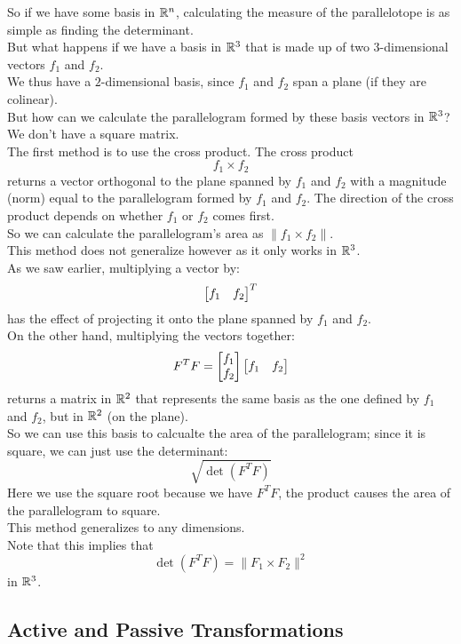 \documentclass[12pt]{article}
\begin{document}
So if we have some basis in $\mathbb{R}^n$,
calculating the measure of the
parallelotope is as simple as finding the
determinant. \\

But what happens if we have a basis in $\mathbb{R}^3$
that is made up of two $3$-dimensional vectors $f_1$
and $f_2$. \\
We thus have a $2$-dimensional basis,
since $f_1$ and $f_2$ span a plane
(if they are colinear). \\
But how can we calculate the parallelogram
formed by these basis vectors in $\mathbb{R}^3$?
We don't have a square matrix. \\

The first method is to use the cross product.
The cross product
\[ f_1 \times f_2 \]
returns a vector orthogonal to the plane
spanned by $f_1$ and $f_2$
with a magnitude (norm) equal to
the parallelogram formed by $f_1$ and $f_2$.
The direction of the cross product
depends on whether $f_1$ or $f_2$
comes first. \\
So we can calculate the parallelogram's
area as $\|f_1 \times f_2\|$. \\

This method does not generalize however
as it only works in $\mathbb{R}^3$. \\
As we saw earlier,
multiplying a vector by:
\[ \begin{bmatrix} {f_1} & {f_2} \end{bmatrix}^T \]
has the effect of projecting it
onto the plane spanned by $f_1$ and $f_2$. \\
On the other hand,
multiplying the vectors together:
\[ F^TF = \begin{bmatrix} {f_1} \\ {f_2} \end{bmatrix}
\begin{bmatrix} {f_1}& {f_2} \end{bmatrix} \]
returns a matrix in $\mathbb{R}^2$
that represents the same basis
as the one defined by $f_1$ and $f_2$,
but in $\mathbb{R}^2$ (on the plane). \\
So we can use this basis to calcualte
the area of the parallelogram;
since it is square,
we can just use the determinant:
\[ \sqrt{\det(F^TF)} \]
Here we use the square root because we have
$F^TF$,
the product causes the area of the parallelogram
to square. \\
This method generalizes to any dimensions. \\

Note that this implies that
\[ \det(F^TF) = \|F_1 \times F_2\|^2 \]
in $\mathbb{R}^3$. \\

\newpage

\subsection*{Active and Passive Transformations}
\end{document}
